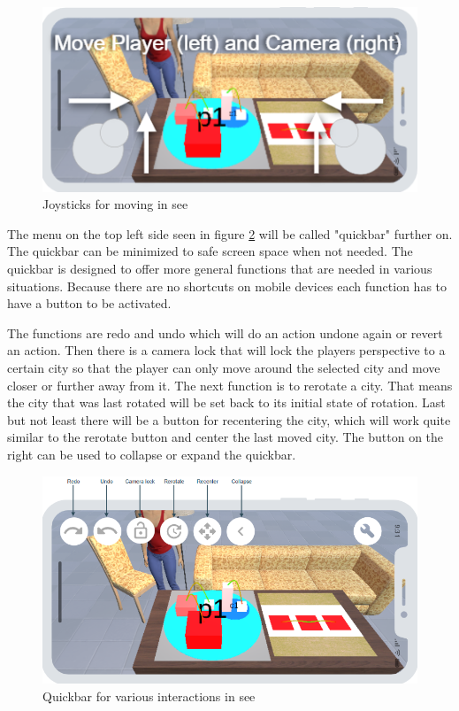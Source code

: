 \begin{figure}[htb]
    \centering
    \includegraphics[width=1\textwidth]{Concept/img/joystick.png}
    \caption{Joysticks for moving in \gls{see}}\label{fig:joystick}
\end{figure}

The menu on the top left side seen in figure \ref{fig:quickbar} will be called "quickbar" further on. 
The quickbar can be minimized to safe screen space when not needed. 
The quickbar is designed to offer more general functions that are needed in various situations.
Because there are no shortcuts on mobile devices each function has to have a button to be activated.

The functions are redo and undo which will do an action undone again or revert an action.
Then there is a camera lock that will lock the players perspective to a certain \gls{city} so that the player can only move around the selected city and move closer or further away from it.
The next function is to rerotate a \gls{city}.
That means the \gls{city} that was last rotated will be set back to its initial state of rotation.
Last but not least there will be a button for recentering the city, which will work quite similar to the rerotate button and center the last moved \gls{city}.
The button on the right can be used to collapse or expand the quickbar.
\begin{figure}[htb]
    \centering
    \includegraphics[width=1\textwidth]{Concept/img/quickbar.png}
    \caption{Quickbar for various interactions in \gls{see}}\label{fig:quickbar}
\end{figure}

